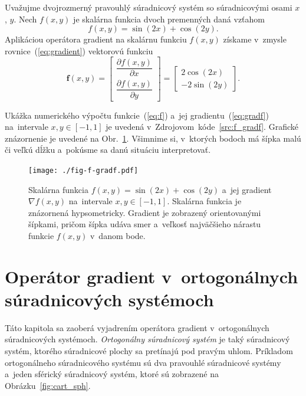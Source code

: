 \documentclass[a4paper,12pt]{book}
\let\vec\mathbf
\begin{document}
Uvažujme dvojrozmerný pravouhlý súradnicový systém so súradnicovými osami $x$,
$y$.  Nech $f(x, y)$ je skalárna funkcia dvoch premenných daná vzťahom
%
\begin{equation}
\label{eq:f}
f(x, y) = \sin(2x) + \cos(2y){.}
\end{equation}
%
Aplikáciou operátora gradient na skalárnu funkciu $f(x, y)$ získame v~zmysle
rovnice~(\ref{eq:gradient}) vektorovú funkciu
%
\begin{equation}
\label{eq:gradf}
\vec f(x, y) =
\begin{bmatrix}
\dfrac{\partial f(x, y)}{\partial x} \\[2ex]
\dfrac{\partial f(x, y)}{\partial y}
\end{bmatrix}
=
\begin{bmatrix}
2 \cos(2x) \\[2ex]
-2 \sin(2y)
\end{bmatrix}
{.}
\end{equation}

Ukážka numerického výpočtu funkcie~(\ref{eq:f}) a~jej
gradientu~(\ref{eq:gradf}) na~intervale $x, y \in [-1, 1]$ je uvedená
v~Zdrojovom~kóde~\ref{src:f_gradf}.  Grafické znázornenie je uvedené na
Obr.~\ref{fig:f_gradf}.  Všimnime si, v~ktorých bodoch má šípka malú či veľkú
dĺžku a~pokúsme sa danú situáciu interpretovať.



\begin{figure}[bt]
\centering
\texttt{[image: ./fig-f-gradf.pdf]}
\caption{Skalárna funkcia $f(x, y) = \sin(2x) + \cos(2y)$ a~jej gradient
$\nabla f(x, y)$ na~intervale $x, y \in [-1, 1]$.  Skalárna funkcia je
znázornená hypsometricky.  Gradient je zobrazený orientovanými šípkami, pričom
šípka udáva smer a~veľkosť najväčšieho nárastu funkcie $f(x, y)$ v~danom bode.}
\label{fig:f_gradf}
\end{figure}






\chapter{Operátor gradient v~ortogonálnych súradnicových systémoch}
\label{app:gradient_in_orthogonal_systems}

Táto kapitola sa zaoberá vyjadrením operátora gradient v~ortogonálnych 
súradnicových systémoch.  \emph{Ortogonálny súradnicový systém} je taký 
súradnicový systém, ktorého súradnicové plochy sa pretínajú pod pravým uhlom.  
Príkladom ortogonálneho súradnicového systému sú dva pravouhlé súradnicové 
systémy a~jeden sférický súradnicový systém, ktoré sú zobrazené na 
Obrázku~\ref{fig:cart_sph}.
\end{document}
